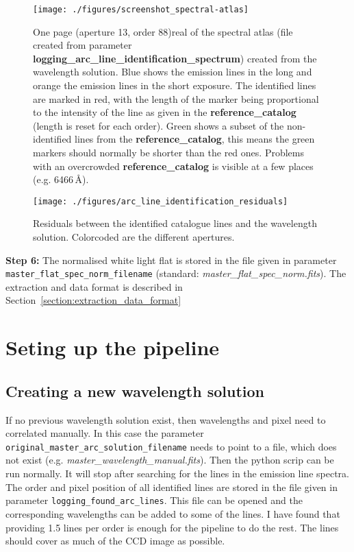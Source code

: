 \documentclass[10pt,a4paper]{article}
\begin{document}
\begin{figure} 
  \begin{center}
    \texttt{[image: ./figures/screenshot\_spectral-atlas]}
  \end{center} 
  \caption{One page (aperture 13, order 88)real  of the spectral atlas (file created from parameter \textbf{logging\_arc\_line\_identification\_spectrum}) created from the wavelength solution. Blue shows the emission lines in the long and orange the emission lines in the short exposure. The identified lines are marked in red, with the length of the marker being proportional to the intensity of the line as given in the \textbf{reference\_catalog} (length is reset for each order). Green shows a subset of the non-identified lines from the \textbf{reference\_catalog}, this means the green markers should normally be shorter than the red ones. Problems with an overcrowded \textbf{reference\_catalog} is visible at a few places (e.g. 6466\,\AA).
    \label{figure_arc_line_identification_spectrum}}
\end{figure}


\begin{figure} 
  \begin{center}
    \texttt{[image: ./figures/arc\_line\_identification\_residuals]}
  \end{center} 
  \caption{Residuals between the identified catalogue lines and the wavelength solution. Colorcoded are the different apertures.
    \label{figure_arc_line_identification_residuals}}
\end{figure}

\vspace{0.5em}\noindent \textbf{Step 6:} The normalised white light flat is stored in the file given in parameter \verb|master_flat_spec_norm_filename| (standard: \textit{master\_flat\_spec\_norm.fits}). The extraction and data format is described in Section~\ref{section:extraction_data_format}


\newpage
\section{Seting up the pipeline}

\subsection{Creating a new wavelength solution}
\label{section:create_new_wave_solution}
If no previous wavelength solution exist, then wavelengths and pixel need to correlated manually. In this case the parameter \verb|original_master_arc_solution_filename| needs to point to a file, which does not exist (e.g. \textit{master\_wavelength\_manual.fits}). Then the python scrip can be run normally. It will stop after searching for the lines in the emission line spectra. The order and pixel position of all identified lines are stored in the file given in parameter \verb|logging_found_arc_lines|. This file can be opened and the corresponding wavelengths can be added to some of the lines. I have found that providing 1.5 lines per order is enough for the pipeline to do the rest. The lines should cover as much of the CCD image as possible.
\end{document}
